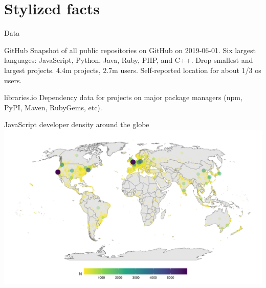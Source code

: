 \documentclass[
  ignorenonframetext,
  aspectratio=169,
]{beamer}
\begin{document}
\section{Stylized facts}\label{stylized-facts}

\begin{frame}{Data}
\protect\hypertarget{data}{}
\begin{block}{GitHub}
\protect\hypertarget{github}{}
Snapshot of all public repositories on GitHub on 2019-06-01. Six largest
languages: JavaScript, Python, Java, Ruby, PHP, and C++. Drop smallest
and largest projects. 4.4m projects, 2.7m users. Self-reported location
for about 1/3 os users.
\end{block}

\begin{block}{libraries.io}
\protect\hypertarget{libraries.io}{}
Dependency data for projects on major package managers (npm, PyPI,
Maven, RubyGems, etc).
\end{block}
\end{frame}

\begin{frame}{JavaScript developer density around the globe}
\protect\hypertarget{javascript-developer-density-around-the-globe}{}
\includegraphics{figures/map_developers.png}
\end{frame}
\end{document}
